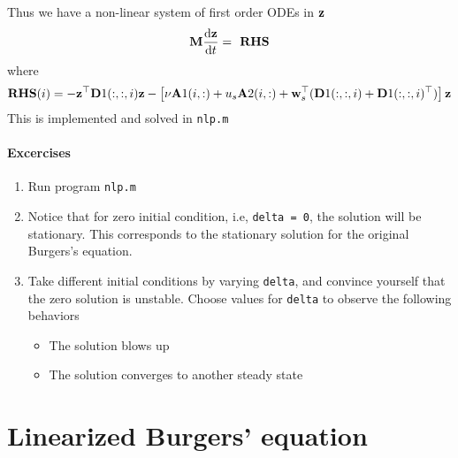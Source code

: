 \documentclass[12pt]{article}
\begin{document}
Thus we have a non-linear system of first order ODEs in ${\mathbf z}$
\begin{eqnarray*}
 {\mathbf M} \frac{\textrm{d} {\mathbf z}}{\textrm{d} t} = \textbf{ RHS} 
\end{eqnarray*}
where 
\begin{eqnarray*}
 \textbf{RHS}(i) = - {\mathbf z}^\top {\mathbf D}1(:,:,i) {\mathbf z} - \left[ \nu {\mathbf A}1(i,:) + u_s {\mathbf A}2(i,:) + {\mathbf w}_s^\top ({\mathbf D}1(:,:,i) + {\mathbf D}1(:,:,i)^\top) \right] {\mathbf z}
\end{eqnarray*}
This is implemented and solved in {\tt nlp.m}

\paragraph{Excercises}

\begin{enumerate}

\item Run program {\tt nlp.m}

\item Notice that for zero initial condition, i.e, {\tt delta = 0}, the solution will be stationary. This corresponds to the stationary solution for the original Burgers's equation.

\item Take different initial conditions by varying {\tt delta}, and convince yourself that the zero solution is unstable. Choose values for {\tt delta} to observe the following behaviors
   \begin{itemize}
    \item The solution blows up
    \item The solution converges to another steady state
   \end{itemize}
\end{enumerate}


\section{Linearized Burgers' equation}
\end{document}
